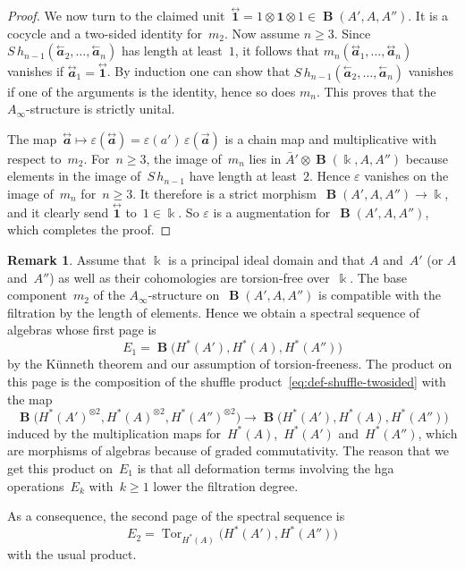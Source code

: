 \documentclass[letterpaper]{amsart}
\numberwithin{equation}{section}
\theoremstyle{plain}
\theoremstyle{definition}
\newtheorem{remark}[theorem]{Remark}
\theoremstyle{remark}
\let\epsilon\varepsilon
\DeclareMathOperator{\Tor}{Tor}
\def\Ainf{A_{\infty}}
\DeclareMathOperator{\BB}{\mathbf{B}}
\def\kk{\Bbbk}
\def\BBone{\mathbf{1}}
\def\tBBone{\overset{\text{$\leftrightarrow$}}{\BBone}}
\def\aa{\mathbfit{a}}
\def\laa{\overset{\text{$\leftarrow$}}{\aa}}
\def\raa{\overset{\text{$\rightarrow$}}{\aa}}
\def\taa{\overset{\text{$\leftrightarrow$}}{\aa}}
\begin{document}
\begin{proof}
  We now turn to the claimed unit~$\tBBone=1\otimes\BBone\otimes1\in \BB(A',A,A'')$.
  It is a cocycle and a two-sided identity for~$m_{2}$. Now assume $n\ge3$.
  Since $S\,h_{n-1}(\laa_{2},\dots,\laa_{n})$ has length at least~$1$, it follows that $m_{n}(\taa_{1},\dots,\taa_{n})$
  vanishes if $\taa_{1}=\tBBone$. By induction one can show that $S\,h_{n-1}(\laa_{2},\dots,\laa_{n})$ vanishes
  if one of the arguments is the identity, hence so does $m_{n}$. This proves that the $\Ainf$-structure
  is strictly unital.

  The map~$\taa\mapsto\epsilon(\taa)=\epsilon(a')\,\epsilon(\raa)$ is a chain map and multiplicative with respect to~$m_{2}$.
  For~$n\ge3$, the image of~$m_{n}$ lies in $\bar A'\otimes \BB(\kk,A,A'')$
  because elements in the image of~$S\,h_{n-1}$ have length at least~$2$.
  Hence $\epsilon$ vanishes on the image of~$m_{n}$ for~$n\ge3$.
  It therefore is a strict morphism~$\BB(A',A,A'')\to\kk$,
  and it clearly send $\tBBone$ to~$1\in\kk$. So $\epsilon$ is a augmentation for~$\BB(A',A,A'')$, which completes the proof.
\end{proof}

\begin{remark}
  \label{rem:product-E2}
  Assume that $\kk$ is a principal ideal domain
  and that $A$ and~$A'$ (or $A$ and~$A''$) as well as their cohomologies are torsion-free over~$\kk$.
  The base component~$m_{2}$ of the $\Ainf$-structure on~$\BB(A',A,A'')$ is compatible with the filtration
  by the length of elements. Hence we obtain a spectral sequence of algebras whose first page is
  \begin{equation}
    E_{1} = \BB\bigl(H^{*}(A'),H^{*}(A),H^{*}(A'')\bigr)
  \end{equation}
  by the Künneth theorem and our assumption of torsion-freeness.
  The product on this page is the composition of the shuffle product~\eqref{eq:def-shuffle-twosided}
  with the map
  \begin{equation}
    \BB\bigl(H^{*}(A')^{\otimes2},H^{*}(A)^{\otimes2},H^{*}(A'')^{\otimes2}\bigr)
    \to \BB\bigl(H^{*}(A'),H^{*}(A),H^{*}(A'')\bigr)
  \end{equation}
  induced by the multiplication maps for~$H^{*}(A)$,~$H^{*}(A')$ and~$H^{*}(A'')$,
  which are morphisms of algebras because of graded commutativity.
  The reason that we get this product on~$E_{1}$ is that all deformation terms
  involving the hga operations~$E_{k}$ with~$k\ge1$ lower the filtration degree.

  As a consequence, the second page of the spectral sequence is
  \begin{equation}
    E_{2} = \Tor_{H^{*}(A)}\bigl(H^{*}(A'),H^{*}(A'')\bigr)
  \end{equation}
  with the usual product.
\end{remark}
\end{document}
